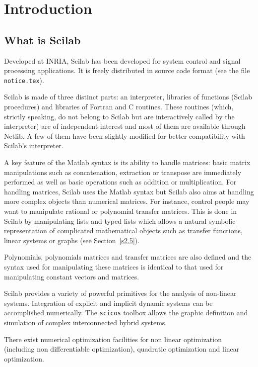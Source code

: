 \chapter{Introduction}

\section{What is Scilab}

Developed at INRIA, Scilab has been developed for system control and
signal processing applications. It 
is freely distributed in source code format (see the file {\tt notice.tex}). 

Scilab is made of three distinct parts: an interpreter, 
libraries of functions (Scilab procedures) and libraries of Fortran 
and C routines. 
These routines (which, strictly speaking, do not belong to Scilab but
are interactively called by the interpreter) are of 
independent interest and most of them are available through Netlib. 
A few of them have been slightly modified for better compatibility
with Scilab's interpreter.
 
A key feature of the Matlab syntax is its ability to handle matrices: 
basic matrix manipulations such as concatenation, 
extraction or transpose are immediately performed as well as basic operations
such as addition or multiplication. For handling matrices, Scilab uses 
the Matlab syntax but Scilab also aims at handling more complex
objects than numerical matrices. For instance, control people may want
to manipulate rational or polynomial transfer matrices. This is
done in Scilab by manipulating lists and typed lists which allows a 
natural symbolic representation of complicated
mathematical objects such as transfer functions, linear systems or graphs
(see Section~\ref{s2.5}).

        Polynomials, polynomials matrices and transfer matrices 
are also defined and the syntax used for manipulating these matrices
is identical to that used for manipulating constant vectors and matrices.

        Scilab provides a variety of powerful primitives for
the analysis of non-linear systems.  
Integration of explicit and implicit dynamic systems can be accomplished 
numerically.  The {\tt scicos} toolbox allows the graphic definition
and simulation of complex interconnected hybrid systems.

 There exist numerical optimization 
facilities for non linear optimization (including
non differentiable optimization), quadratic optimization and 
linear optimization.

